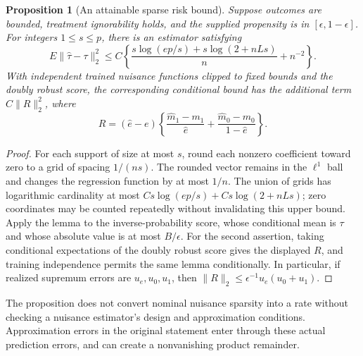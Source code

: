 \documentclass[11pt]{article}
\newtheorem{proposition}[theorem]{Proposition}
\theoremstyle{remark}
\begin{document}
\begin{proposition}[An attainable sparse risk bound]
Suppose outcomes are bounded, treatment ignorability holds, and the supplied propensity is in $[\epsilon,1-\epsilon]$. For integers $1\le s\le p$, there is an estimator satisfying
\[
 E\|\widehat\tau-\tau\|_2^2\le C\left\{\frac{s\log(ep/s)+s\log(2+nLs)}n+n^{-2}\right\}.
\]
With independent trained nuisance functions clipped to fixed bounds and the doubly robust score, the corresponding conditional bound has the additional term $C\|R\|_2^2$, where
\[
 R=(\widehat e-e)\left\{\frac{\widehat m_1-m_1}{\widehat e}
 +\frac{\widehat m_0-m_0}{1-\widehat e}\right\}.
\]
\end{proposition}
\begin{proof}
For each support of size at most $s$, round each nonzero coefficient toward zero to a grid of spacing $1/(ns)$. The rounded vector remains in the $\ell^1$ ball and changes the regression function by at most $1/n$. The union of grids has logarithmic cardinality at most
$C s\log(ep/s)+C s\log(2+nLs)$; zero coordinates may be counted repeatedly without invalidating this upper bound. Apply the lemma to the inverse-probability score, whose conditional mean is $\tau$ and whose absolute value is at most $B/\epsilon$. For the second assertion, taking conditional expectations of the doubly robust score gives the displayed $R$, and training independence permits the same lemma conditionally. In particular, if realized supremum errors are $u_e,u_0,u_1$, then $\|R\|_2\le\epsilon^{-1}u_e(u_0+u_1)$.
\end{proof}
The proposition does not convert nominal nuisance sparsity into a rate without checking a nuisance estimator's design and approximation conditions. Approximation errors in the original statement enter through these actual prediction errors, and can create a nonvanishing product remainder.
\end{document}
